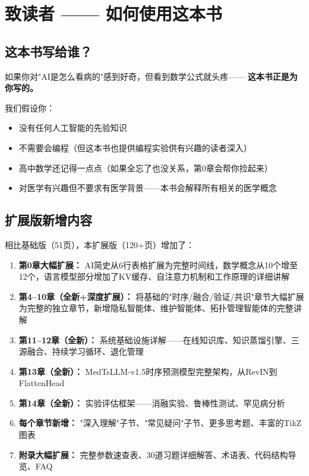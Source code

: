 \documentclass[11pt,a4paper]{ctexart}
\begin{document}
\section*{致读者 —— 如何使用这本书}

\subsection*{这本书写给谁？}

如果你对"AI是怎么看病的"感到好奇，但看到数学公式就头疼——
\textbf{这本书正是为你写的。}

我们假设你：
\begin{itemize}[nosep]
\item 没有任何人工智能的先验知识
\item 不需要会编程（但这本书也提供编程实验供有兴趣的读者深入）
\item 高中数学还记得一点点（如果全忘了也没关系，第0章会帮你捡起来）
\item 对医学有兴趣但不要求有医学背景——本书会解释所有相关的医学概念
\end{itemize}

\subsection*{扩展版新增内容}

相比基础版（51页），本扩展版（120+页）增加了：

\begin{enumerate}[nosep]
\item \textbf{第0章大幅扩展：} AI简史从6行表格扩展为完整时间线，数学概念从10个增至12个，语言模型部分增加了KV缓存、自注意力机制和工作原理的详细讲解
\item \textbf{第4--10章（全新+深度扩展）：} 将基础的"时序/融合/验证/共识"章节大幅扩展为完整的独立章节，新增隐私智能体、维护智能体、拓扑管理智能体的完整讲解
\item \textbf{第11--12章（全新）：} 系统基础设施详解——在线知识库、知识蒸馏引擎、三源融合、持续学习循环、退化管理
\item \textbf{第13章（全新）：} MedTsLLM-v1.5时序预测模型完整架构，从RevIN到FlattenHead
\item \textbf{第14章（全新）：} 实验评估框架——消融实验、鲁棒性测试、罕见病分析
\item \textbf{每个章节新增：} "深入理解"子节、"常见疑问"子节、更多思考题、丰富的TikZ图表
\item \textbf{附录大幅扩展：} 完整参数速查表、30道习题详细解答、术语表、代码结构导览、FAQ
\end{enumerate}
\end{document}
